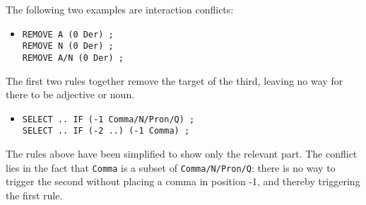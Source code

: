 The following two examples are interaction conflicts:

\begin{itemize}
\item[]\begin{verbatim}
REMOVE A (0 Der) ; 
REMOVE N (0 Der) ; 
REMOVE A/N (0 Der) ; 
\end{verbatim}
\end{itemize}

The first two rules together remove the target of the third, leaving no way for there to be adjective or noun.

\begin{itemize}
\item[]\begin{verbatim}
SELECT .. IF (-1 Comma/N/Pron/Q) ;
SELECT .. IF (-2 ..) (-1 Comma) ;
\end{verbatim}
\end{itemize}

The rules above have been simplified to show only the relevant part.
The conflict lies in the fact that \texttt{Comma} is a subset of \texttt{Comma/N/Pron/Q}:
there is no way to trigger the second without placing a comma in position -1, and thereby triggering the first rule.










